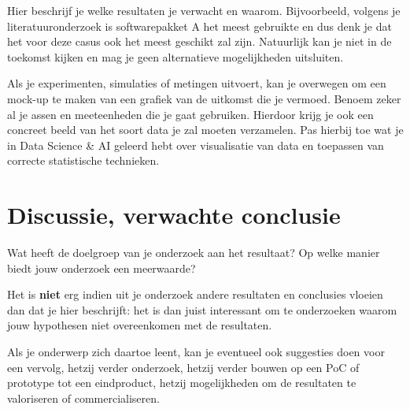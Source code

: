 \documentclass{hogent-article}
\begin{document}

Hier beschrijf je welke resultaten je verwacht en waarom. Bijvoorbeeld, volgens je literatuuronderzoek is softwarepakket A het meest gebruikte en dus denk je dat het voor deze casus ook het meest geschikt zal zijn. Natuurlijk kan je niet in de toekomst kijken en mag je geen alternatieve mogelijkheden uitsluiten.

Als je experimenten, simulaties of metingen uitvoert, kan je overwegen om een mock-up te maken van een grafiek van de uitkomst die je vermoed. Benoem zeker al je assen en meeteenheden die je gaat gebruiken. Hierdoor krijg je ook een concreet beeld van het soort data je zal moeten verzamelen. Pas hierbij toe wat je in Data Science \& AI geleerd hebt over visualisatie van data en toepassen van correcte statistische technieken.

\section{Discussie, verwachte conclusie}%
\label{sec:discussie-conclusie}

Wat heeft de doelgroep van je onderzoek aan het resultaat? Op welke manier biedt jouw onderzoek een meerwaarde?

Het is \textbf{niet} erg indien uit je onderzoek andere resultaten en conclusies vloeien dan dat je hier beschrijft: het is dan juist interessant om te onderzoeken waarom jouw hypothesen niet overeenkomen met de resultaten.

Als je onderwerp zich daartoe leent, kan je eventueel ook suggesties doen voor een vervolg, hetzij verder onderzoek, hetzij verder bouwen op een PoC of prototype tot een eindproduct, hetzij mogelijkheden om de resultaten te valoriseren of commercialiseren.


\end{document}
